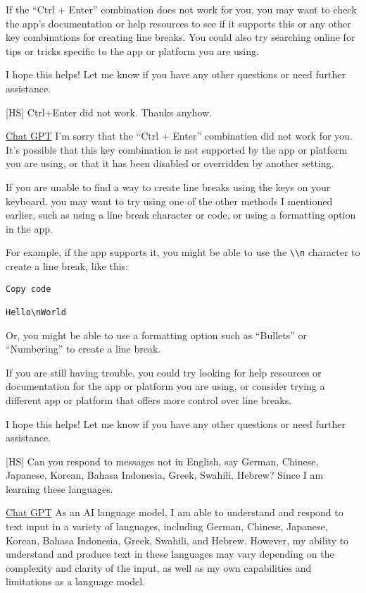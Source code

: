 \documentclass[
]{book}
\theoremstyle{definition}
\theoremstyle{definition}
\theoremstyle{definition}
\theoremstyle{definition}
\theoremstyle{remark}
\begin{document}
If the ``Ctrl + Enter'' combination does not work for you, you may want to check the app's documentation or help resources to see if it supports this or any other key combinations for creating line breaks. You could also try searching online for tips or tricks specific to the app or platform you are using.

I hope this helps! Let me know if you have any other questions or need further assistance.

{[}HS{]} Ctrl+Enter did not work. Thanks anyhow.

\protect\hyperlink{chatgpt}{Chat GPT} I'm sorry that the ``Ctrl + Enter'' combination did not work for you. It's possible that this key combination is not supported by the app or platform you are using, or that it has been disabled or overridden by another setting.

If you are unable to find a way to create line breaks using the keys on your keyboard, you may want to try using one of the other methods I mentioned earlier, such as using a line break character or code, or using a formatting option in the app.

For example, if the app supports it, you might be able to use the \texttt{\textbackslash{}\textbackslash{}n} character to create a line break, like this:

\begin{verbatim}
Copy code

Hello\nWorld
\end{verbatim}

Or, you might be able to use a formatting option such as ``Bullets'' or ``Numbering'' to create a line break.

If you are still having trouble, you could try looking for help resources or documentation for the app or platform you are using, or consider trying a different app or platform that offers more control over line breaks.

I hope this helps! Let me know if you have any other questions or need further assistance.

{[}HS{]} Can you respond to messages not in English, say German, Chinese, Japanese, Korean, Bahasa Indonesia, Greek, Swahili, Hebrew? Since I am learning these languages.

\protect\hyperlink{chatgpt}{Chat GPT} As an AI language model, I am able to understand and respond to text input in a variety of languages, including German, Chinese, Japanese, Korean, Bahasa Indonesia, Greek, Swahili, and Hebrew. However, my ability to understand and produce text in these languages may vary depending on the complexity and clarity of the input, as well as my own capabilities and limitations as a language model.
\end{document}
